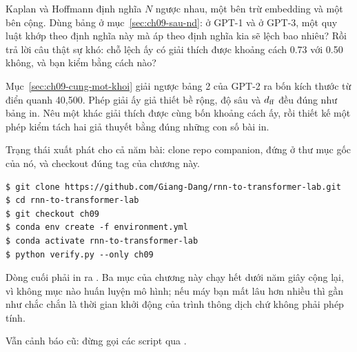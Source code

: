 \begin{bt}
  \item Kaplan và Hoffmann định nghĩa \(N\) ngược nhau, một bên trừ embedding
    và một bên cộng. Dùng bảng ở mục~\ref{sec:ch09-sau-nd}: ở GPT-1 và ở GPT-3,
    một quy luật khớp theo định nghĩa này mà áp theo định nghĩa kia sẽ lệch bao
    nhiêu? Rồi trả lời câu thật sự khó: chỗ lệch ấy có giải thích được khoảng
    cách 0.73 với 0.50 không, và bạn kiểm bằng cách nào?

  \item Mục~\ref{sec:ch09-cung-mot-khoi} giải ngược bảng 2 của GPT-2 ra bốn
    kích thước từ điển quanh 40,500. Phép giải ấy giả thiết bề rộng, độ sâu và
    \(d_{\mathrm{ff}}\) đều đúng như bảng in. Nêu một  khác
    giải thích được cùng
    bốn khoảng cách ấy, rồi thiết kế một phép kiểm tách hai giả thuyết bằng
    đúng những con số bài in.
\end{bt}

\tierapply

Trạng thái xuất phát cho cả năm bài: clone repo companion, đứng ở thư mục gốc
của nó, và checkout đúng tag của chương này.

\begin{verbatim}
$ git clone https://github.com/Giang-Dang/rnn-to-transformer-lab.git
$ cd rnn-to-transformer-lab
$ git checkout ch09
$ conda env create -f environment.yml
$ conda activate rnn-to-transformer-lab
$ python verify.py --only ch09
\end{verbatim}

Dòng cuối phải in ra . Ba mục của chương này chạy hết dưới năm
giây cộng lại, vì không mục nào huấn luyện mô hình; nếu máy bạn mất lâu hơn
nhiều thì gần như chắc chắn là thời gian khởi động của trình thông dịch chứ
không phải phép tính.

Vẫn cảnh báo cũ: đừng gọi các script qua .


